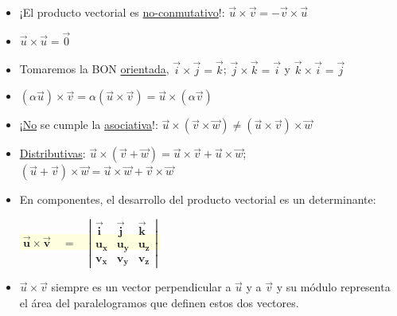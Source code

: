 \begin{itemize}
\item ¡El producto vectorial es \underline{no-conmutativo}!: $\vec u \times \vec v=-\vec v \times \vec u$

		
\vspace{-2mm} \item  $\vec u \times \vec u=\vec 0$
		
\vspace{-2mm} \item  Tomaremos la BON \underline{orientada}, $\vec i \times \vec j = \vec k$; $\vec j \times \vec k = \vec i$ y $\vec k \times \vec i = \vec j$
		
\vspace{-2mm} \item  $(\alpha \vec u)\times \vec v=\alpha (\vec u \times \vec v)= \vec u \times (\alpha \vec v)$
		
\vspace{-2mm} \item  ¡\underline{No} se cumple la \underline{asociativa}!: $\vec u \times (\vec v \times \vec w) \neq (\vec u \times \vec v)\times \vec w$
		
\vspace{-2mm} \item  \underline{Distributivas}: $\vec u \times (\vec v + \vec w)= \vec u \times \vec v + \vec u \times \vec w$; $(\vec u + \vec v)\times \vec w=\vec u \times \vec w + \vec v \times \vec w$
		
\vspace{-2mm} \item  En componentes, el desarrollo del producto vectorial es un determinante:
		
\centerline{\colorbox{LightYellow}{$\; \boldsymbol {\overrightarrow { u } \times \overrightarrow { v } \quad =\quad \left| \begin{matrix} \overrightarrow { i }  & \overrightarrow { j }  & \overrightarrow { k }  \\ u_x & u_y & u_z \\ v_x & v_y & v_z \end{matrix} \right|}\;  $}}

\vspace{-2mm} \item $\vec u \times \vec v$ siempre es un vector perpendicular a $\vec u$ y a $\vec v$ y su módulo representa el área del paralelogramos que definen estos dos vectores.
\end{itemize}
\justify

